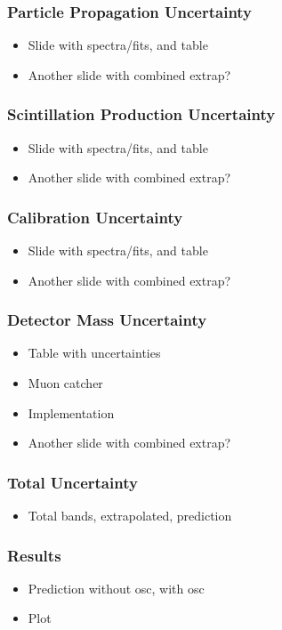 \documentclass[10pt,professionalfonts,xcolor=table]{beamer}
\begin{document}
\begin{frame}
\frametitle{Particle Propagation Uncertainty}
\begin{itemize}
\item Slide with spectra/fits, and table
\item Another slide with combined extrap?
\end{itemize}
\end{frame}

\begin{frame}
\frametitle{Scintillation Production Uncertainty}
\begin{itemize}
\item Slide with spectra/fits, and table
\item Another slide with combined extrap?
\end{itemize}
\end{frame}

\begin{frame}
\frametitle{Calibration Uncertainty}
\begin{itemize}
\item Slide with spectra/fits, and table
\item Another slide with combined extrap?
\end{itemize}
\end{frame}


\begin{frame}
\frametitle{Detector Mass Uncertainty}
\begin{itemize}
\item Table with uncertainties
\item Muon catcher
\item Implementation
\item Another slide with combined extrap?
\end{itemize}
\end{frame}

\begin{frame}
\frametitle{Total Uncertainty}
\begin{itemize}
\item Total bands, extrapolated, prediction
\end{itemize}
\end{frame}


\begin{frame}
\frametitle{Results}
\begin{itemize}
\item Prediction without osc, with osc
\item Plot
\end{itemize}
\end{frame}
\end{document}
